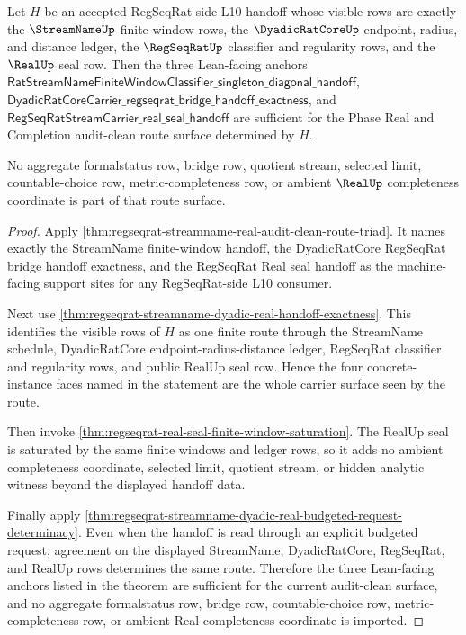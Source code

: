 \begin{theorem}
\label{thm:regseqrat-audit-clean-route-sufficiency}
Let $H$ be an accepted RegSeqRat-side L10 handoff whose visible rows are
exactly the $\StreamNameUp$ finite-window rows, the $\DyadicRatCoreUp$
endpoint, radius, and distance ledger, the $\RegSeqRatUp$ classifier and
regularity rows, and the $\RealUp$ seal row. Then the three Lean-facing
anchors
$\mathsf{RatStreamNameFiniteWindowClassifier\_singleton\_diagonal\_handoff}$,
$\mathsf{DyadicRatCoreCarrier\_regseqrat\_bridge\_handoff\_exactness}$, and
$\mathsf{RegSeqRatStreamCarrier\_real\_seal\_handoff}$ are sufficient for the
Phase Real and Completion audit-clean route surface determined by $H$.

No aggregate formalstatus row, bridge row, quotient stream, selected limit,
countable-choice row, metric-completeness row, or ambient $\RealUp$
completeness coordinate is part of that route surface.
\end{theorem}
\begin{proof}
Apply
\autoref{thm:regseqrat-streamname-real-audit-clean-route-triad}. It names
exactly the StreamName finite-window handoff, the DyadicRatCore RegSeqRat
bridge handoff exactness, and the RegSeqRat Real seal handoff as the
machine-facing support sites for any RegSeqRat-side L10 consumer.

Next use \autoref{thm:regseqrat-streamname-dyadic-real-handoff-exactness}.
This identifies the visible rows of $H$ as one finite route through the
StreamName schedule, DyadicRatCore endpoint-radius-distance ledger,
RegSeqRat classifier and regularity rows, and public RealUp seal row. Hence
the four concrete-instance faces named in the statement are the whole carrier
surface seen by the route.

Then invoke \autoref{thm:regseqrat-real-seal-finite-window-saturation}. The
RealUp seal is saturated by the same finite windows and ledger rows, so it
adds no ambient completeness coordinate, selected limit, quotient stream, or
hidden analytic witness beyond the displayed handoff data.

Finally apply
\autoref{thm:regseqrat-streamname-dyadic-real-budgeted-request-determinacy}.
Even when the handoff is read through an explicit budgeted request, agreement
on the displayed StreamName, DyadicRatCore, RegSeqRat, and RealUp rows
determines the same route. Therefore the three Lean-facing anchors listed in
the theorem are sufficient for the current audit-clean surface, and no
aggregate formalstatus row, bridge row, countable-choice row,
metric-completeness row, or ambient Real completeness coordinate is imported.
\end{proof}
